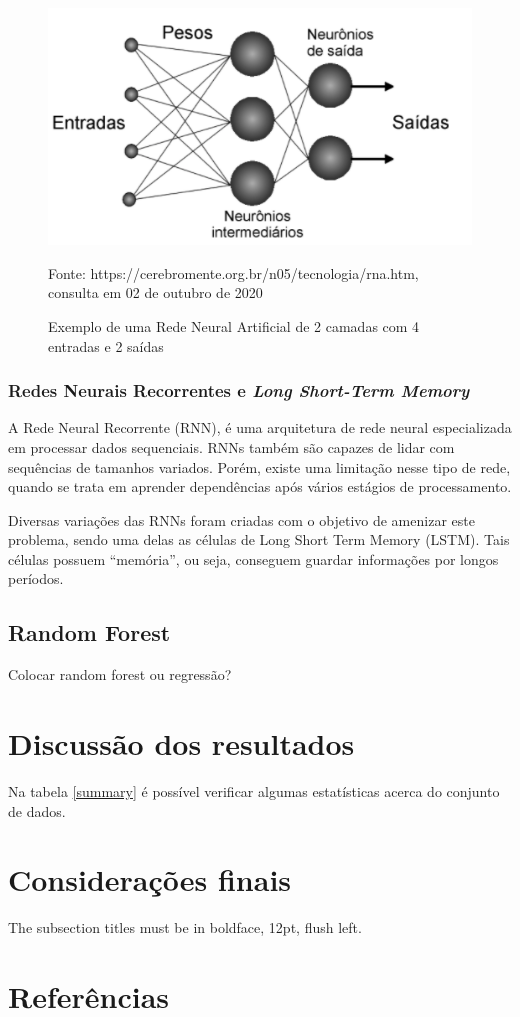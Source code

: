 \documentclass[12pt]{article}
\begin{document}
\begin{figure}[ht]
  \centering
  \includegraphics[scale=0.6]{img/nnet.png}
  \caption{Exemplo de uma Rede Neural Artificial de 2 camadas com 4 entradas e 2 saídas}
  Fonte: https://cerebromente.org.br/n05/tecnologia/rna.htm, \\consulta em 02 de 
  outubro de 2020
  \label{fig:nnet}
\end{figure}

\subsubsection{Redes Neurais Recorrentes e \textit{Long Short-Term Memory}}

A Rede Neural Recorrente (RNN), é uma arquitetura de rede neural especializada em
processar dados sequenciais. RNNs também são capazes de lidar com sequências de
tamanhos variados. Porém, existe uma limitação nesse tipo de rede, quando se trata
em aprender dependências após vários estágios de processamento.

Diversas variações das RNNs foram criadas com o objetivo de amenizar este
problema, sendo uma delas as células de Long Short Term Memory (LSTM). Tais
células possuem “memória”, ou seja, conseguem guardar informações por longos
períodos.

\subsection{Random Forest}

Colocar random forest ou regressão?

\section{Discussão dos resultados}

Na tabela 
\ref{summary} é possível verificar algumas estatísticas acerca do conjunto de 
dados.



\section{Considerações finais}

The subsection titles must be in boldface, 12pt, flush left.

\section{Referências}



\end{document}
